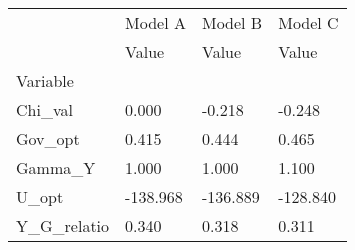 \begin{tabular}{llll}
\toprule
{} &   Model A &   Model B &   Model C \\
{} &     Value &     Value &     Value \\
Variable    &           &           &           \\
\midrule
Chi\_val     &     0.000 &    -0.218 &    -0.248 \\
Gov\_opt     &     0.415 &     0.444 &     0.465 \\
Gamma\_Y     &     1.000 &     1.000 &     1.100 \\
U\_opt       &  -138.968 &  -136.889 &  -128.840 \\
Y\_G\_relatio &     0.340 &     0.318 &     0.311 \\
\bottomrule
\end{tabular}
